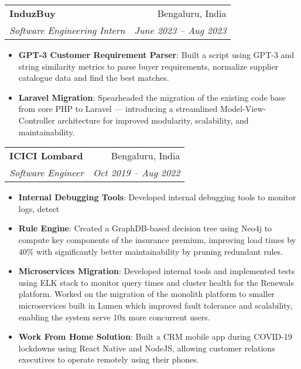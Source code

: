 \documentclass[letterpaper,11pt]{article}
\makeatletter
\newcommand{\resumeItem}[2]{
  \item\small{
    \textbf{#1}{: #2 \vspace{-2pt}}
  }
}
\newcommand{\resumeSubheading}[4]{
  \vspace{-1pt}\item
    \begin{tabular*}{0.97\textwidth}[t]{l@{\extracolsep{\fill}}r}
      \textbf{#1} & #2 \\
      \textit{\small#3} & \textit{\small #4} \\
    \end{tabular*}\vspace{-5pt}
}
\newcommand{\resumeSubSubheading}[2]{
    \begin{tabular*}{0.97\textwidth}{l@{\extracolsep{\fill}}r}
      \textit{\small#1} & \textit{\small #2} \\
    \end{tabular*}\vspace{-5pt}
}
\newcommand{\resumeSubHeadingListEnd}{\end{itemize}}
\newcommand{\resumeItemListStart}{\begin{itemize}}
\newcommand{\resumeItemListEnd}{\end{itemize}\vspace{-5pt}}
\makeatother
\begin{document}
    \resumeSubheading
        {InduzBuy}{Bengaluru, India}
        {Software Engineering Intern}{June 2023 -- Aug 2023}
        \resumeItemListStart      
          \resumeItem{GPT-3 Customer Requirement Parser}{Built a script using GPT-3 and string similarity metrics to parse buyer requirements, normalize supplier catalogue data and find the best matches.}
          \resumeItem{Laravel Migration}{Spearheaded the migration of the existing code base from core PHP to Laravel --- introducing a streamlined Model-View-Controller architecture for improved modularity, scalability, and maintainability.}
        \resumeItemListEnd
    \resumeSubheading
      {ICICI Lombard}{Bengaluru, India}
      {Software Engineer}{Oct 2019 -- Aug 2022}
      \resumeItemListStart
      \resumeItem{Internal Debugging Tools}{
        Developed internal debugging tools to monitor logs, detect 
      }
    \resumeItem{Rule Engine}
      {Created a GraphDB-based decision tree using Neo4j to compute key components of the insurance premium, improving load times by 40\% with significantly better maintainability by pruning redundant rules.}

    \resumeItem{Microservices Migration}{
      Developed internal tools and implemented tests using ELK stack to monitor query times and cluster health for the Renewals platform.
      Worked on the migration of the monolith platform to smaller microservices built in Lumen which improved fault tolerance and scalability, enabling the system serve 10x more concurrent users.
    }
        
    \resumeItem{Work From Home Solution}
      {Built a CRM mobile app during COVID-19 lockdowns using React Native and NodeJS, allowing customer relations executives to operate remotely using their phones.}
      
    \resumeItemListEnd
      
\end{document}
